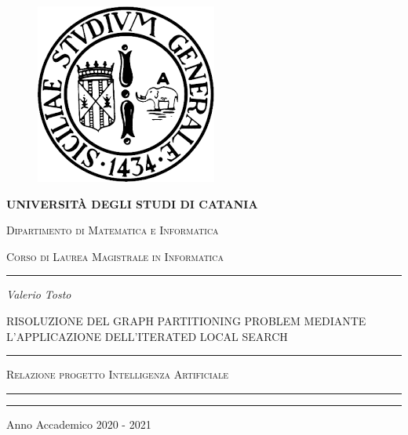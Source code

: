 \documentclass[12pt,titlepage,oneside]{article}
\begin{document}
\newcommand\tab[1][1cm]{\hspace*{#1}}
\thispagestyle{empty}
\begin{titlepage}
\centering

\begin{figure}[!t]
	\begin{center}
		\includegraphics[width=0.25\columnwidth]{logo.png}
	\end{center}
\end{figure}

{\Large \textbf{UNIVERSIT\`A DEGLI STUDI DI CATANIA}}

{\scshape
\large
Dipartimento di Matematica e Informatica
}

{\scshape
\normalsize
Corso di Laurea Magistrale in Informatica
}

\bigskip


\hrule

\vspace{1cm}

{\itshape
\large
Valerio Tosto
\par}

\vspace{0.5cm}


{\centering
\Large
RISOLUZIONE DEL GRAPH PARTITIONING PROBLEM MEDIANTE L'APPLICAZIONE DELL'ITERATED LOCAL SEARCH
\par}

\vspace{1.5cm}


\begin{minipage}[b]{8 cm}
\hrule

\bigskip

{\centering\scshape 
Relazione progetto Intelligenza Artificiale
\par}


\bigskip

\hrule
\end{minipage}

\vspace{2.4cm}


\hrule

\bigskip


{\centering
Anno Accademico 2020 - 2021
\par}
\end{titlepage}
\end{document}
